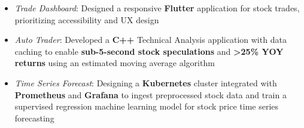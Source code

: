 \begin{itemize}
  \item \textit{Trade Dashboard}: Designed a responsive \textbf{Flutter} application for stock trades, prioritizing accessibility and UX design
  \item \textit{Auto Trader}: Developed a \textbf{C++} Technical Analysis application with data caching to enable \textbf{sub-5-second stock speculations} and \textbf{\textgreater{}25\% YOY returns} using an estimated moving average algorithm
  \item \textit{Time Series Forecast}: Designing a \textbf{Kubernetes} cluster integrated with \textbf{Prometheus} and \textbf{Grafana} to ingest preprocessed stock data and train a supervised regression machine learning model for stock price time series forecasting
\end{itemize}
